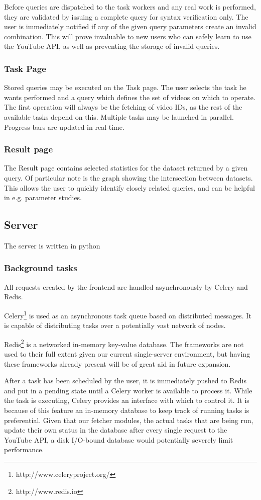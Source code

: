Before queries are dispatched to the task workers and any real work is
performed, they are validated by issuing a complete query for syntax
verification only. The user is immediately notified if any of the given query
parameters create an invalid combination. This will prove invaluable to new
users who can safely learn to use the YouTube API, as well as preventing
the storage of invalid queries.


\subsubsection{Task Page}
Stored queries may be executed on the Task page. The user selects the task he
wants performed and a query which defines the set of videos on which to operate.
The first operation will always be the fetching of video IDs, as the rest of the
available tasks depend on this. Multiple tasks may be launched in parallel.
Progress bars are updated in real-time. %


\subsubsection{Result page}
The Result page contains selected statistics for the dataset returned by a given
query. Of particular note is the graph showing the intersection between datasets. This
allows the user to quickly identify closely related queries, and can be helpful
in e.g. parameter studies.


\subsection{Server}
The server is written in python %


\subsubsection{Background tasks}
All requests created by the frontend are handled asynchronously by Celery and
Redis.

Celery\footnote{http://www.celeryproject.org/} is used as an asynchronous task
queue based on distributed messages. It is capable of distributing tasks over a
potentially vast network of nodes.

Redis\footnote{http://www.redis.io} is a networked in-memory key-value database.
The frameworks are not used to their full extent given
our current single-server environment, but having these frameworks already
present will be of great aid in future expansion.

After a task has been scheduled by the user, it is immediately pushed to Redis
and put in a pending state until a Celery worker is available to process it.
While the task is executing, Celery provides an interface with which to control
it. It is because of this feature an in-memory database to keep track of running
tasks is preferential. Given that our fetcher modules, the actual tasks that are
being run, update their own status in the database after every single request to
the YouTube API, a disk I/O-bound database would potentially severely limit
performance.

